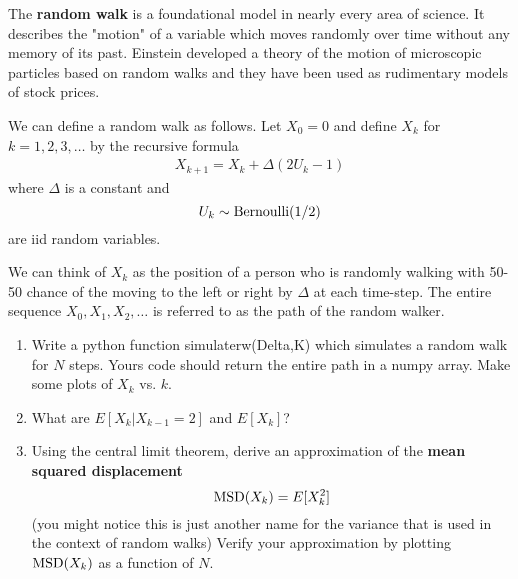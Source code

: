\begin{exercise}
The {\bf random walk} is a foundational model in nearly every area of science.  It describes the "motion" of a variable which moves randomly over time without any memory of its past. Einstein developed a theory of the motion of microscopic particles based on random walks and they have been used as rudimentary models of stock prices. 

We can define a random walk as follows. 
Let $X_0=0$ and define $X_k$ for $k=1,2,3,\dots$ by the recursive formula 
\begin{align}\label{eq:rw}
X_{k+1} = X_{k}  + \Delta(2U_k - 1)
\end{align}
where $\Delta$ is a constant and 
\begin{equation*}
U_k  \sim {\rm Bernoulli}(1/2)
\end{equation*}
are iid random variables. 


We can think of $X_k$ as the position of a person who is randomly walking with 50-50 chance of the moving to the left or right by $\Delta$ at each time-step. The entire sequence $X_0,X_1,X_2,\dots$ is referred to as the path of the random walker. 
\begin{enumerate}[label=(\alph*)]
\item Write a python function simulaterw(Delta,K) which simulates a random walk for $N$ steps. Yours code should return the entire path in a numpy array. Make some plots of $X_k$ vs. $k$. 
\item What are $E[X_k|X_{k-1}=2]$ and $E[X_k]$? 
\item Using the central limit theorem, derive an approximation of the {\bf mean squared displacement}
\begin{equation*}
{\rm MSD}(X_k) = E[X_k^2]
\end{equation*}
(you might notice this is just another name for the variance that is used in the context of random walks)
Verify your approximation by plotting ${\rm MSD}(X_k)$ as a function of $N$. 
\end{enumerate}





\end{exercise}
